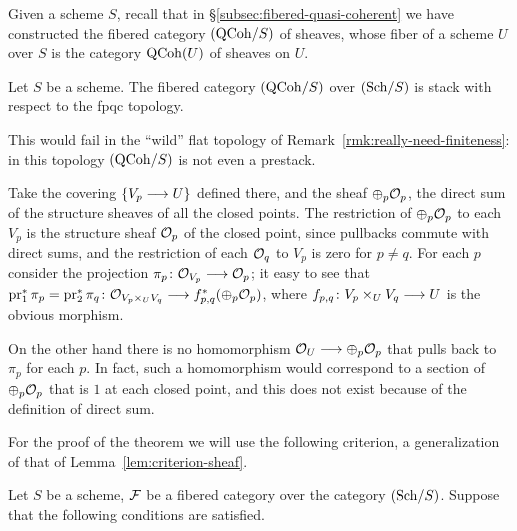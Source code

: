 \begin{4   STACKS}
\begin{4.2 Descent for quasi-coherent sheaves}
Given a scheme $S$, recall that in \S\ref{subsec:fibered-quasi-coherent} we have constructed the fibered category $({\mathrm{QCoh}/S})$ of \qc sheaves, whose fiber of a scheme $U$ over $S$ is the category $\operatorname{QCoh}(U)$ of \qc sheaves on $U$.

\begin{theorem}\label{thm:main}
Let $S$ be a scheme. The fibered category $({\mathrm{QCoh}/S})$ over $({\mathrm{Sch}/S})$ is stack with respect to the fpqc topology.
\end{theorem}


\begin{remark}\label{rmk:really-really-need-finiteness}
%
This would fail in the ``wild'' flat topology of Remark~\ref{rmk:really-need-finiteness}: in this topology $({\mathrm{QCoh}/S})$ is not even a prestack.

Take the covering $\{V_p \arr U\}$ defined there, and the \qc sheaf $\oplus_p \mathcal{O}_p$, the direct sum of the structure sheaves of all the closed points. The restriction of $\oplus_p \mathcal{O}_p$ to each $V_p$ is the structure sheaf $\mathcal{O}_p$ of the closed point, since pullbacks commute with direct sums, and the restriction of each $\mathcal{O}_q$ to $V_p$ is zero for $p \neq q$. For each $p$ consider the projection $\pi_p \colon \cO_{V_p} \arr \cO_p$; it easy to see that $\pr_1^* \pi_p = \pr_2^* \pi_q \colon \cO_{V_p \times_U V_q} \arr f_{p,q}^* (\oplus_{p} \cO_p)$, where $f_{p,q} \colon V_p \times_U V_q \arr U$ is the obvious morphism.

On the other hand there is no homomorphism $\cO_U \arr \oplus_{p} \cO_p$ that pulls back to $\pi_p$ for each $p$. In fact, such a homomorphism would correspond to a section of $\oplus_{p} \mathcal{O}_p$ that is $1$ at each closed point, and this does not exist because of the definition of direct sum.
\end{remark}

For the proof of the theorem we will use the following criterion, a generalization of that of Lemma~\ref{lem:criterion-sheaf}.


\begin{lemma}\label{lem:criterion-stack}

Let $S$ be a scheme, $\mathcal{F}$ be a fibered category over the category $({\mathrm{Sch}/S})$. Suppose that the following conditions are satisfied.

\begin{enumeratei}


\end{enumeratei}
\end{lemma}
\end{4.2 Descent for quasi-coherent sheaves}
\end{4   STACKS}
